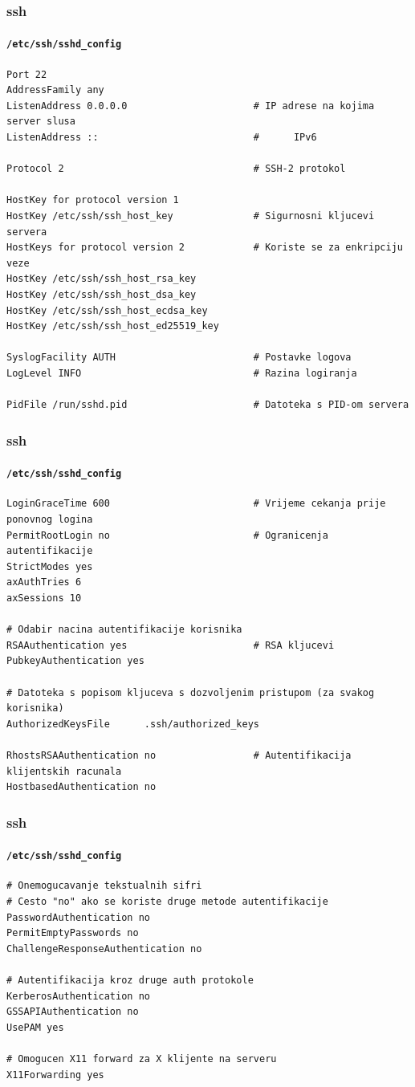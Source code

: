 \documentclass[t,table,usenames,dvipsnames]{beamer}
\begin{document}
\begin{frame}[fragile]
	\frametitle{ssh}
	\framesubtitle{\texttt{/etc/ssh/sshd\_config}}
	\scriptsize
	\begin{verbatim}
Port 22
AddressFamily any
ListenAddress 0.0.0.0                      # IP adrese na kojima server slusa
ListenAddress ::                           #      IPv6

Protocol 2                                 # SSH-2 protokol

HostKey for protocol version 1
HostKey /etc/ssh/ssh_host_key              # Sigurnosni kljucevi servera
HostKeys for protocol version 2            # Koriste se za enkripciju veze
HostKey /etc/ssh/ssh_host_rsa_key
HostKey /etc/ssh/ssh_host_dsa_key
HostKey /etc/ssh/ssh_host_ecdsa_key
HostKey /etc/ssh/ssh_host_ed25519_key

SyslogFacility AUTH                        # Postavke logova
LogLevel INFO                              # Razina logiranja

PidFile /run/sshd.pid                      # Datoteka s PID-om servera
	\end{verbatim}


\end{frame}

\begin{frame}[fragile]
	\frametitle{ssh}
	\framesubtitle{\texttt{/etc/ssh/sshd\_config}}
	\scriptsize
	\begin{verbatim}
LoginGraceTime 600                         # Vrijeme cekanja prije ponovnog logina
PermitRootLogin no                         # Ogranicenja autentifikacije
StrictModes yes
axAuthTries 6
axSessions 10

# Odabir nacina autentifikacije korisnika
RSAAuthentication yes                      # RSA kljucevi
PubkeyAuthentication yes

# Datoteka s popisom kljuceva s dozvoljenim pristupom (za svakog korisnika)
AuthorizedKeysFile      .ssh/authorized_keys

RhostsRSAAuthentication no                 # Autentifikacija klijentskih racunala
HostbasedAuthentication no
	\end{verbatim}

\end{frame}

\begin{frame}[fragile]
	\frametitle{ssh}
	\framesubtitle{\texttt{/etc/ssh/sshd\_config}}
	\scriptsize
	\begin{verbatim}
# Onemogucavanje tekstualnih sifri
# Cesto "no" ako se koriste druge metode autentifikacije
PasswordAuthentication no
PermitEmptyPasswords no
ChallengeResponseAuthentication no

# Autentifikacija kroz druge auth protokole
KerberosAuthentication no
GSSAPIAuthentication no
UsePAM yes

# Omogucen X11 forward za X klijente na serveru
X11Forwarding yes

	\end{verbatim}

\end{frame}
\end{document}
